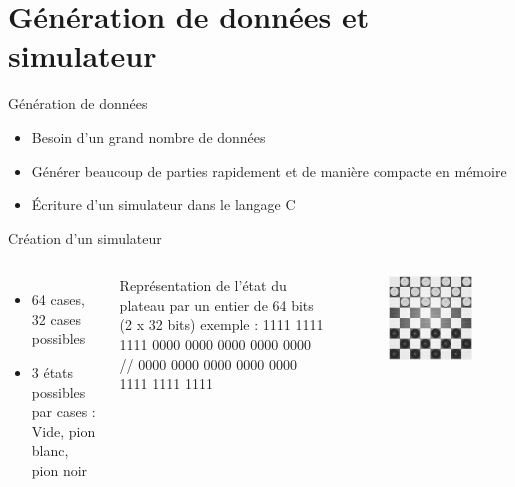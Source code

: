 \documentclass{beamer}
\begin{document}
{\section{Génération de données et simulateur}}

\begin{frame}{Génération de données}
    \begin{itemize}
        \item Besoin d'un \alert{grand nombre de données}
        \item Générer beaucoup de parties \alert{rapidement} et de manière \alert{compacte} en mémoire
        \item Écriture d'un simulateur dans le langage \alert{C}
    \end{itemize}
\end{frame}

\begin{frame}{Création d'un simulateur}
    \begin{columns}
        \begin{itemize}
            \item 64 cases, 32 cases possibles
            \item 3 états possibles par cases : \newline
                  Vide, pion blanc, pion noir
        \end{itemize}
        Représentation de l'état du plateau par un entier de 64 bits (\alert{2 x 32 bits})
        exemple : 1111 1111 1111 0000 0000 0000 0000 0000 // 0000 0000 0000 0000 0000 1111 1111 1111

        \begin{figure}
            \centering
            \includegraphics[width=\columnwidth]{im/dames2.png}
        \end{figure}
    \end{columns}
\end{frame}
\end{document}
